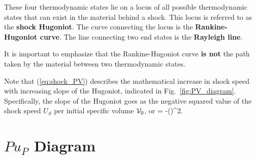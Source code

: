 These four thermodynamic states lie on a locus of all possible 
thermodynamic states that can exist in the material behind a shock.  This
locus is referred to as the {\bf shock Hugoniot}.  The curve connecting the
locus is the {\bf Rankine-Hugoniot curve}.  The line connecting two end
states is the {\bf Rayleigh line}.

It is important to emphasize that the Rankine-Hugoniot curve
{\bf is not} the path taken
by the material between two thermodynamic states.  

Note that (\ref{eq:shock_PV}) describes the mathematical increase in shock
speed with increasing slope 
of the Hugoniot, indicated in Fig.~\ref{fig:PV_diagram}.
Specifically, the slope of the Hugoniot goes as the negative squared value
of the shock speed $U_S$ per initial specific volume $\mathcal{V}_0$, or
\be
\dst{} = -\left(\right)^2.
\ee

\section{$Pu_P$ Diagram}

